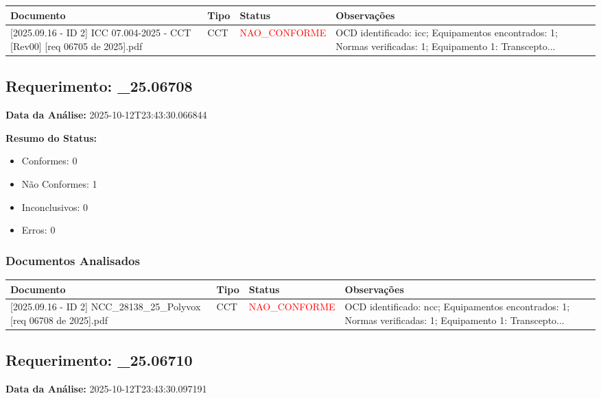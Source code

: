 \documentclass[12pt,a4paper]{article}
\begin{document}
\begin{longtable}{|p{4cm}|p{2cm}|p{2cm}|p{6cm}|}
\hline
\textbf{Documento} & \textbf{Tipo} & \textbf{Status} & \textbf{Observações} \\
\hline
\endhead
[Certificado de Conformidade Técnica - CCT][2025.09.16 - ID 2] ICC 07.004-2025 - CCT [Rev00] [req 06705 de 2025].pdf & CCT & \textcolor{red}{NAO\_CONFORME} & OCD identificado: icc; Equipamentos encontrados: 1; Normas verificadas: 1; Equipamento 1: Transcepto... \\
\hline
\end{longtable}


\subsection{Requerimento: \_25.06708}

\textbf{Data da Análise:} 2025-10-12T23:43:30.066844

\textbf{Resumo do Status:}
\begin{itemize}
    \item Conformes: 0
    \item Não Conformes: 1
    \item Inconclusivos: 0
    \item Erros: 0
\end{itemize}

\subsubsection{Documentos Analisados}

\begin{longtable}{|p{4cm}|p{2cm}|p{2cm}|p{6cm}|}
\hline
\textbf{Documento} & \textbf{Tipo} & \textbf{Status} & \textbf{Observações} \\
\hline
\endhead
[Certificado de Conformidade Técnica - CCT][2025.09.16 - ID 2] NCC\_28138\_25\_Polyvox [req 06708 de 2025].pdf & CCT & \textcolor{red}{NAO\_CONFORME} & OCD identificado: ncc; Equipamentos encontrados: 1; Normas verificadas: 1; Equipamento 1: Transcepto... \\
\hline
\end{longtable}


\subsection{Requerimento: \_25.06710}

\textbf{Data da Análise:} 2025-10-12T23:43:30.097191
\end{document}
